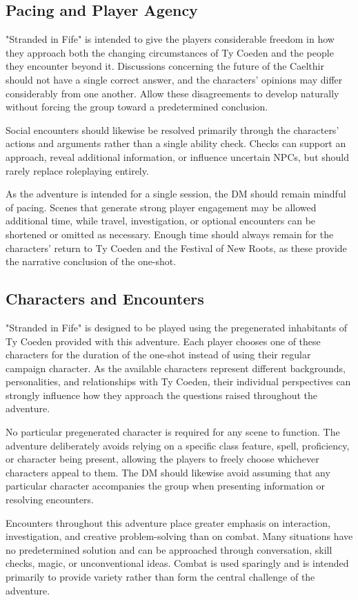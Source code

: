 \subsection*{Pacing and Player Agency}
{\entryfont "Stranded in Fife" is intended to give the players considerable freedom in how they approach both the changing circumstances of Ty Coeden and the people they encounter beyond it. Discussions concerning the future of the Caelthir should not have a single correct answer, and the characters' opinions may differ considerably from one another. Allow these disagreements to develop naturally without forcing the group toward a predetermined conclusion.

Social encounters should likewise be resolved primarily through the characters' actions and arguments rather than a single ability check. Checks can support an approach, reveal additional information, or influence uncertain NPCs, but should rarely replace roleplaying entirely.

As the adventure is intended for a single session, the DM should remain mindful of pacing. Scenes that generate strong player engagement may be allowed additional time, while travel, investigation, or optional encounters can be shortened or omitted as necessary. Enough time should always remain for the characters' return to Ty Coeden and the Festival of New Roots, as these provide the narrative conclusion of the one-shot.}
\subsection*{Characters and Encounters}
{\entryfont "Stranded in Fife" is designed to be played using the pregenerated inhabitants of Ty Coeden provided with this adventure. Each player chooses one of these characters for the duration of the one-shot instead of using their regular campaign character. As the available characters represent different backgrounds, personalities, and relationships with Ty Coeden, their individual perspectives can strongly influence how they approach the questions raised throughout the adventure.

No particular pregenerated character is required for any scene to function. The adventure deliberately avoids relying on a specific class feature, spell, proficiency, or character being present, allowing the players to freely choose whichever characters appeal to them. The DM should likewise avoid assuming that any particular character accompanies the group when presenting information or resolving encounters.

Encounters throughout this adventure place greater emphasis on interaction, investigation, and creative problem-solving than on combat. Many situations have no predetermined solution and can be approached through conversation, skill checks, magic, or unconventional ideas. Combat is used sparingly and is intended primarily to provide variety rather than form the central challenge of the adventure.}
